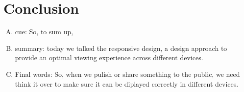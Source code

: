 \documentclass{article}
\begin{document}
\section{Conclusion}
\begin{enumerate}[A.]
\item cue: So, to sum up,
\item summary: today we talked the responsive design, a design approach to provide an optimal viewing experience across different devices.
\item Final words: So, when we pulish or share something to the public, we need think it over to make sure it can be diplayed correctly in different devices.
\end{enumerate}
\end{document}
